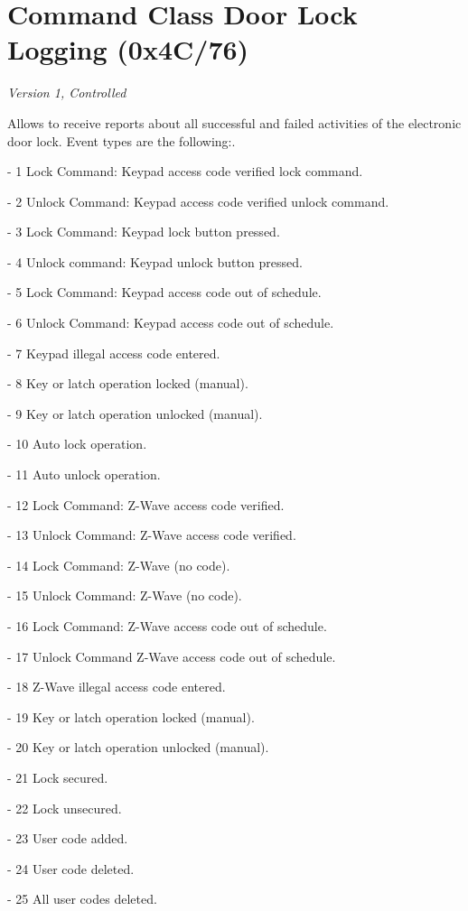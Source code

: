 \section{Command Class Door Lock Logging (0x4C/76)}

\textit{Version 1, Controlled}
\newline

Allows to receive reports about all successful and failed activities of the electronic door lock. Event types are the following:. 

- 1 Lock Command: Keypad access code verified lock command. 

- 2 Unlock Command: Keypad access code verified unlock command. 

- 3 Lock Command: Keypad lock button pressed. 

- 4 Unlock command: Keypad unlock button pressed. 

- 5 Lock Command: Keypad access code out of schedule. 

- 6 Unlock Command: Keypad access code out of schedule. 

- 7 Keypad illegal access code entered. 

- 8 Key or latch operation locked (manual). 

- 9 Key or latch operation unlocked (manual). 

- 10 Auto lock operation. 

- 11 Auto unlock operation. 

- 12 Lock Command: Z-Wave access code verified. 

- 13 Unlock Command: Z-Wave access code verified. 

- 14 Lock Command: Z-Wave (no code). 

- 15 Unlock Command: Z-Wave (no code). 

- 16 Lock Command: Z-Wave access code out of schedule. 

- 17 Unlock Command Z-Wave access code out of schedule. 

- 18 Z-Wave illegal access code entered. 

- 19 Key or latch operation locked (manual). 

- 20 Key or latch operation unlocked (manual). 

- 21 Lock secured. 

- 22 Lock unsecured. 

- 23 User code added. 

- 24 User code deleted. 

- 25 All user codes deleted. 

